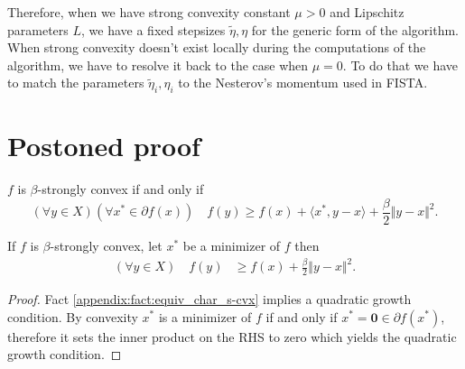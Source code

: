 \documentclass[12pt]{article}
\begin{document}
        Therefore, when we have strong convexity constant $\mu > 0$ and Lipschitz parameters $L$, we have a fixed stepsizes $\tilde \eta, \eta$ for the generic form of the algorithm. 
        When strong convexity doesn't exist locally during the computations of the algorithm, we have to resolve it back to the case when $\mu = 0$. 
        To do that we have to match the parameters $\tilde \eta_i, \eta_i$ to the Nesterov's momentum used in FISTA. 
        




\section{Postoned proof}
    \begin{fact}
    \label{appendix:fact:equiv_char_s-cvx}
        $f$ is $\beta$-strongly convex if and only if
        $$
            (\forall y\in X)(\forall x^* \in \partial f(x))
            \quad f(y) \ge f(x) + \langle x^*, y - x\rangle +
            \frac{\beta}{2}\Vert y - x\Vert^2
            .
        $$
    \end{fact}

    \begin{theorem}\label{appendix:thm:q_growth}
        If $f$ is $\beta$-strongly convex, let $x^*$ be a minimizer of $f$ then 
        \begin{align*}
            (\forall y \in X) \quad 
            f(y) &\ge 
            f(x) + \frac{\beta}{2}\Vert y - x\Vert^2. 
        \end{align*}
    \end{theorem}
    \begin{proof}
        Fact \ref*{appendix:fact:equiv_char_s-cvx} 
        implies a quadratic growth condition. 
        By convexity $x^*$ is a minimizer of $f$ if and only if $x^*= \mathbf 0 \in \partial f(x^*)$, therefore it sets the inner product on the RHS to zero which yields the quadratic growth condition. 
    \end{proof}
\end{document}
